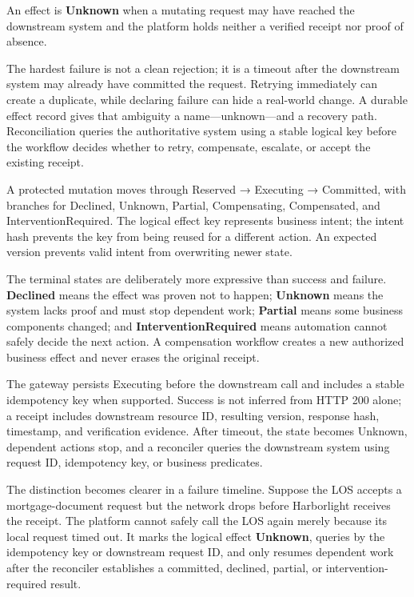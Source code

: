 An effect is \textbf{Unknown} when a mutating request may have reached the downstream system and the platform holds neither a verified receipt nor proof of absence.\par

The hardest failure is not a clean rejection; it is a timeout after the downstream system may already have committed the request. Retrying immediately can create a duplicate, while declaring failure can hide a real-world change. A durable effect record gives that ambiguity a name—unknown—and a recovery path. Reconciliation queries the authoritative system using a stable logical key before the workflow decides whether to retry, compensate, escalate, or accept the existing receipt.\par

A protected mutation moves through Reserved → Executing → Committed, with branches for Declined, Unknown, Partial, Compensating, Compensated, and InterventionRequired. The logical effect key represents business intent; the intent hash prevents the key from being reused for a different action. An expected version prevents valid intent from overwriting newer state.\par


The terminal states are deliberately more expressive than success and failure. \textbf{Declined} means the effect was proven not to happen; \textbf{Unknown} means the system lacks proof and must stop dependent work; \textbf{Partial} means some business components changed; and \textbf{InterventionRequired} means automation cannot safely decide the next action. A compensation workflow creates a new authorized business effect and never erases the original receipt.\par

The gateway persists Executing before the downstream call and includes a stable idempotency key when supported. Success is not inferred from HTTP 200 alone; a receipt includes downstream resource ID, resulting version, response hash, timestamp, and verification evidence. After timeout, the state becomes Unknown, dependent actions stop, and a reconciler queries the downstream system using request ID, idempotency key, or business predicates.\par

The distinction becomes clearer in a failure timeline. Suppose the LOS accepts a mortgage-document request but the network drops before Harborlight receives the receipt. The platform cannot safely call the LOS again merely because its local request timed out. It marks the logical effect \textbf{Unknown}, queries by the idempotency key or downstream request ID, and only resumes dependent work after the reconciler establishes a committed, declined, partial, or intervention-required result.\par

